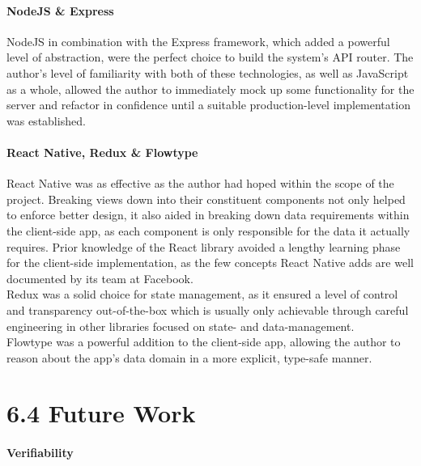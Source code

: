 \documentclass[12pt]{report}
\let\oldparagraph\paragraph
\renewcommand{\paragraph}[1]{\oldparagraph{#1}\mbox{}}
\begin{document}
\paragraph{NodeJS \& Express}\label{nodejs-express}

NodeJS in combination with the Express framework, which added a powerful
level of abstraction, were the perfect choice to build the system's API
router. The author's level of familiarity with both of these
technologies, as well as JavaScript as a whole, allowed the author to
immediately mock up some functionality for the server and refactor in
confidence until a suitable production-level implementation was
established.

\paragraph{React Native, Redux \&
Flowtype}\label{react-native-redux-flowtype}

React Native was as effective as the author had hoped within the scope
of the project. Breaking views down into their constituent components
not only helped to enforce better design, it also aided in breaking down
data requirements within the client-side app, as each component is only
responsible for the data it actually requires. Prior knowledge of the
React library avoided a lengthy learning phase for the client-side
implementation, as the few concepts React Native adds are well
documented by its team at Facebook.\\
Redux was a solid choice for state management, as it ensured a level of
control and transparency out-of-the-box which is usually only achievable
through careful engineering in other libraries focused on state- and
data-management.\\
Flowtype was a powerful addition to the client-side app, allowing the
author to reason about the app's data domain in a more explicit,
type-safe manner.

\section{6.4 Future Work}\label{future-work}

\paragraph{Verifiability}\label{verifiability}
\end{document}
